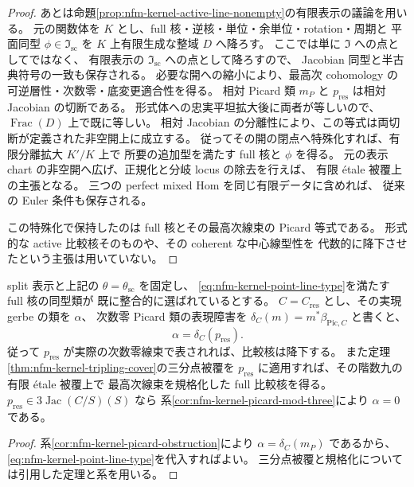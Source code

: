 \begin{proof}
あとは命題\ref{prop:nfm-kernel-active-line-nonempty}の有限表示の議論を用いる。
元の関数体を $K$ とし、full 核・逆核・単位・余単位・rotation・周期と
平面同型 $\phi\in\mathfrak I_{\mathrm{sc}}$ を
$K$ 上有限生成な整域 $D$ へ降ろす。
ここでは単に $\mathfrak I$ への点としてではなく、
有限表示の $\mathfrak I_{\mathrm{sc}}$ への点として降ろすので、
Jacobian 同型と半古典符号の一致も保存される。
必要な開への縮小により、最高次 cohomology の可逆層性・次数零・底変更適合性を得る。
相対 Picard 類 $m_P$ と $p_{\mathrm{res}}$ は相対 Jacobian の切断である。
形式体への忠実平坦拡大後に両者が等しいので、
$\operatorname{Frac}(D)$ 上で既に等しい。
相対 Jacobian の分離性により、この等式は両切断が定義された非空開上に成立する。
従ってその開の閉点へ特殊化すれば、有限分離拡大 $K'/K$ 上で
所要の追加型を満たす full 核と $\phi$ を得る。
元の表示 chart の非空開へ広げ、正規化と分岐 locus の除去を行えば、
有限 \'etale 被覆上の主張となる。
三つの perfect mixed Hom を同じ有限データに含めれば、
従来の Euler 条件も保存される。

この特殊化で保持したのは full 核とその最高次線束の Picard 等式である。
形式的な active 比較核そのものや、その coherent な中心線型性を
代数的に降下させたという主張は用いていない。
\end{proof}

\begin{corollary}[選択済みの核の障害を測る点の平行移動]
\label{cor:nfm-kernel-point-picard-obstruction}
split 表示と上記の $\theta=\theta_{\mathrm{sc}}$ を固定し、
\eqref{eq:nfm-kernel-point-line-type}を満たす full 核の同型類が
既に整合的に選ばれているとする。
$C=C_{\mathrm{res}}$ とし、その実現 gerbe の類を $\alpha$、
次数零 Picard 類の表現障害を
$\delta_C(m)=m^*\beta_{\mathrm{Pic},C}$ と書くと、
\begin{equation}
\label{eq:nfm-kernel-point-brauer-class}
 \alpha=\delta_C(p_{\mathrm{res}}).
\end{equation}
従って $p_{\mathrm{res}}$ が実際の次数零線束で表されれば、比較核は降下する。
また定理\ref{thm:nfm-kernel-tripling-cover}の三分点被覆を
$p_{\mathrm{res}}$ に適用すれば、その階数九の有限 \'etale 被覆上で
最高次線束を規格化した full 比較核を得る。
$p_{\mathrm{res}}\in3\operatorname{Jac}(C/S)(S)$ なら
系\ref{cor:nfm-kernel-picard-mod-three}により $\alpha=0$ である。
\end{corollary}

\begin{proof}
系\ref{cor:nfm-kernel-picard-obstruction}により
$\alpha=\delta_C(m_P)$ であるから、
\eqref{eq:nfm-kernel-point-line-type}を代入すればよい。
三分点被覆と規格化については引用した定理と系を用いる。
\end{proof}


